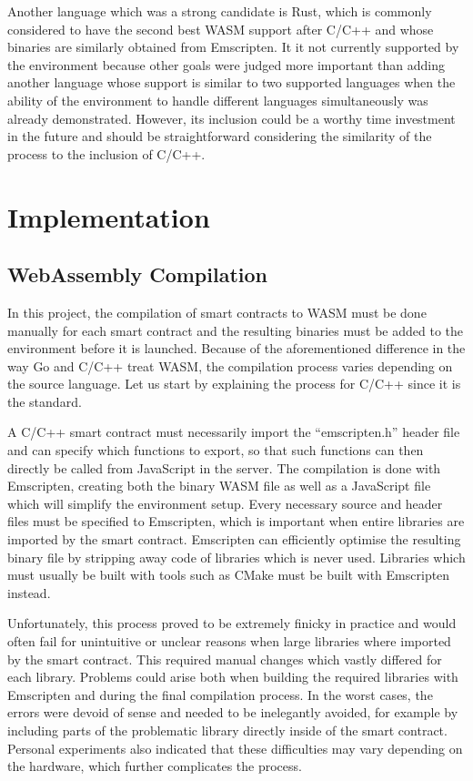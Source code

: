 \documentclass[11pt, a4paper, twoside, openright]{article}
\begin{document}
Another language which was a strong candidate is Rust, which is commonly considered to have the second best WASM support after C/C++ and whose binaries are similarly obtained from Emscripten. It it not currently supported by the environment because other goals were judged more important than adding another language whose support is similar to two supported languages when the ability of the environment to handle different languages simultaneously was already demonstrated. However, its inclusion could be a worthy time investment in the future and should be straightforward considering the similarity of the process to the inclusion of C/C++.


\section{Implementation}

\subsection{WebAssembly Compilation}

In this project, the compilation of smart contracts to WASM must be done manually for each smart contract and the resulting binaries must be added to the environment before it is launched. Because of the aforementioned difference in the way Go and C/C++ treat WASM, the compilation process varies depending on the source language. Let us start by explaining the process for C/C++ since it is the standard.

A C/C++ smart contract must necessarily import the ``emscripten.h'' header file and can specify which functions to export, so that such functions can then directly be called from JavaScript in the server. The compilation is done with Emscripten, creating both the binary WASM file as well as a JavaScript file which will simplify the environment setup. Every necessary source and header files must be specified to Emscripten, which is important when entire libraries are imported by the smart contract. Emscripten can efficiently optimise the resulting binary file by stripping away code of libraries which is never used. Libraries which must usually be built with tools such as CMake must be built with Emscripten instead.

Unfortunately, this process proved to be extremely finicky in practice and would often fail for unintuitive or unclear reasons when large libraries where imported by the smart contract. This required manual changes which vastly differed for each library. Problems could arise both when building the required libraries with Emscripten and during the final compilation process. In the worst cases, the errors were devoid of sense and needed to be inelegantly avoided, for example by including parts of the problematic library directly inside of the smart contract. Personal experiments also indicated that these difficulties may vary depending on the hardware, which further complicates the process.
\end{document}

